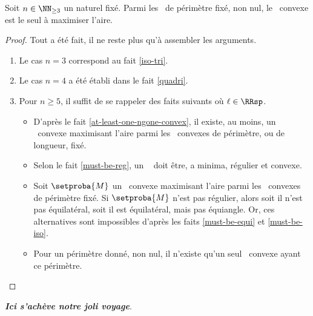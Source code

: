 \begin{fact}
    Soit $n \in \NN_{\geq3}$ un naturel fixé.
    Parmi les \ngones\ de périmètre fixé, non nul,
    le \nreg\ convexe est le seul à maximiser l'aire.
\end{fact}


\begin{proof}
    Tout a été fait, il ne reste plus qu'à assembler les arguments.
    \begin{enumerate}
        \item Le cas $n = 3$ correspond au fait \ref{iso-tri}.
        
        \item Le cas $n = 4$ a été établi dans le fait \ref{quadri}.
        
        \item Pour $n \geq 5$, il suffit de se rappeler des faits suivants où $\ell \in \RRsp$.
        \begin{itemize}
            \item D'après le fait \ref{at-least-one-ngone-convex}, il existe, au moins, un \ngone\ convexe maximisant l'aire parmi les \ngones\ convexes de périmètre, ou de longueur, fixé.

            \item Selon le fait \ref{must-be-reg}, un \ngone\  doit être, a minima, régulier et convexe.

            \item Soit $\setproba{M}$ un \ngone\ convexe maximisant l'aire parmi les \ngones\ convexes de périmètre fixé.
            Si $\setproba{M}$ n'est pas régulier, alors soit il n'est pas équilatéral, soit il est équilatéral, mais pas équiangle.
            Or, ces alternatives sont impossibles d'après les faits \ref{must-be-equi} et \ref{must-be-iso}.

            \item Pour un périmètre donné, non nul, il n'existe qu'un seul \nreg\ convexe ayant ce périmètre.
        \end{itemize} 
	
	\null\vspace{-6ex}
    \end{enumerate}
\end{proof}

\bigskip
\hfill {\small\itshape\bfseries Ici s'achève notre joli voyage}.